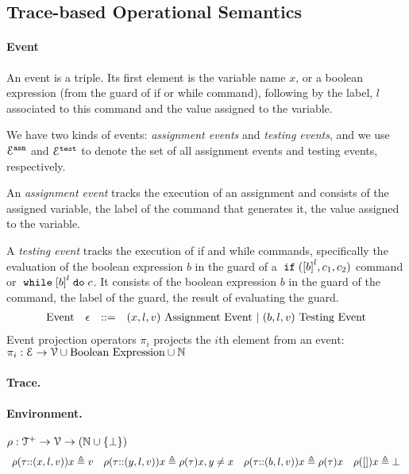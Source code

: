\subsection{{Trace-based Operational Semantics}}
\label{sec:operational_semantics}
\paragraph{Event}
An event is a triple.
Its first element is the variable name $x$,
or a boolean expression (from the guard of if or while command), 
following by 
 the label, $l$ associated to this command and the value assigned to the variable.

 We have two kinds of events: \emph{assignment events} and \emph{testing events},
 and we use $\mathcal{E}^{\mathtt{{asn}}}$ and $\mathcal{E}^{\mathtt{{test}}}$ to denote the set of all assignment events and testing events, respectively.

 An \emph{assignment event} tracks the execution of an assignment and consists of the assigned variable, the label of the command that generates it, the value assigned to the variable.
 
 A \emph{testing event} tracks the execution of if and while commands, specifically the evaluation of the boolean expression $b$ in the guard of a $\eif(\clabel{b}^l, c_1, c_2)$ command or $\ewhile \clabel{b}^l \edo c$.
 It consists of the boolean expression $b$ in the guard of the command, the label of the guard, the result of evaluating the guard.
%
\[
\begin{array}{llll}
  \mbox{Event} 
  & \mathtt{\epsilon} & ::= & 
  ({x}, l, v) ~ \mbox{Assignment Event} 
  ~|~(b, l, v) ~ \mbox{Testing Event}
\end{array}
\]
Event projection operators $\pi_i$ projects the $i$th element from an event: 
\\
$\pi_i : 
\mathcal{E} \to \mathcal{V}\cup \mbox{Boolean Expression}  \cup \mathbb{N} $

\paragraph{Trace.}

%
\paragraph{Environment.} $\rho : {\mathcal{T}^{+}}  \to \mathcal{V} \to(\mathbb{N} \cup \{\bot\})$
\[
\begin{array}{llll}
\rho(\mathtt{\tau}  {\small ::} (x, l, v)) x \triangleq v
&
\rho(\mathtt{\tau} {\small ::} (y, l, v)) x \triangleq \rho(\mathtt{\tau}) x, y \neq x
&
\rho(\mathtt{\tau} {\small ::} (b, l, v)) x \triangleq \rho(\mathtt{\tau}) x
&
\rho({[]} ) x \triangleq \bot
\end{array}
\]
%
